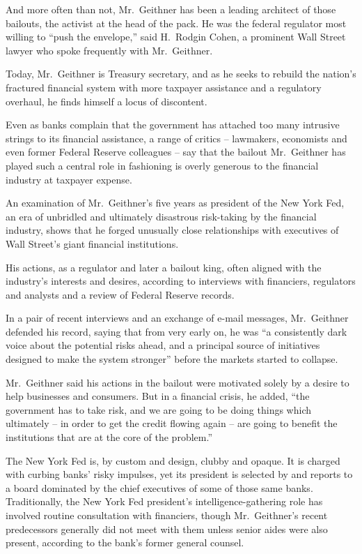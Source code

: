 \documentclass[12pt,a4paper,onecolumn]{article}
\begin{document}
And more often than not, Mr.~Geithner has been a leading architect of those bailouts, the activist
at the head of the pack. He was the federal regulator most willing to ``push the envelope,'' said
H.~Rodgin Cohen, a prominent Wall Street lawyer who spoke frequently with Mr.~Geithner.

Today, Mr.~Geithner is Treasury secretary, and as he seeks to rebuild the nation's fractured
financial system with more taxpayer assistance and a regulatory overhaul, he finds himself a locus
of discontent.

Even as banks complain that the government has attached too many intrusive strings to its financial
assistance, a range of critics -- lawmakers, economists and even former Federal Reserve colleagues
-- say that the bailout Mr.~Geithner has played such a central role in fashioning is overly generous
to the financial industry at taxpayer expense.

An examination of Mr.~Geithner's five years as president of the New York Fed, an era of unbridled
and ultimately disastrous risk-taking by the financial industry, shows that he forged unusually
close relationships with executives of Wall Street's giant financial institutions.

His actions, as a regulator and later a bailout king, often aligned with the industry's interests
and desires, according to interviews with financiers, regulators and analysts and a review of
Federal Reserve records.

In a pair of recent interviews and an exchange of e-mail messages, Mr.~Geithner defended his record,
saying that from very early on, he was ``a consistently dark voice about the potential risks ahead,
and a principal source of initiatives designed to make the system stronger'' before the markets
started to collapse.

Mr.~Geithner said his actions in the bailout were motivated solely by a desire to help businesses
and consumers. But in a financial crisis, he added, ``the government has to take risk, and we are
going to be doing things which ultimately -- in order to get the credit flowing again -- are going
to benefit the institutions that are at the core of the problem.''

The New York Fed is, by custom and design, clubby and opaque. It is charged with curbing banks'
risky impulses, yet its president is selected by and reports to a board dominated by the chief
executives of some of those same banks. Traditionally, the New York Fed president's
intelligence-gathering role has involved routine consultation with financiers, though Mr.~Geithner's
recent predecessors generally did not meet with them unless senior aides were also present,
according to the bank's former general counsel.
\end{document}
